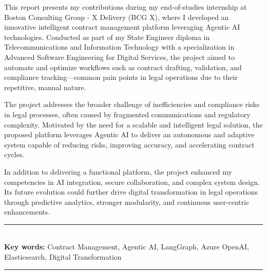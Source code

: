 This report presents my contributions during my end-of-studies internship at Boston Consulting Group - X Delivery (BCG X), where I developed an innovative intelligent contract management platform leveraging Agentic AI technologies. Conducted as part of my State Engineer diploma in Telecommunications and Information Technology with a specialization in Advanced Software Engineering for Digital Services, the project aimed to automate and optimize workflows such as contract drafting, validation, and compliance tracking—common pain points in legal operations due to their repetitive, manual nature.\mynewline

The project addresses the broader challenge of inefficiencies and compliance risks in legal processes, often caused by fragmented communications and regulatory complexity. Motivated by the need for a scalable and intelligent legal solution, the proposed platform leverages Agentic AI to deliver an autonomous and adaptive system capable of reducing risks, improving accuracy, and accelerating contract cycles.\mynewline

In addition to delivering a functional platform, the project enhanced my competencies in AI integration, secure collaboration, and complex system design. Its future evolution could further drive digital transformation in legal operations through predictive analytics, stronger modularity, and continuous user-centric enhancements.

\bigskip

\noindent\rule{\textwidth}{0.3mm} \\[0.4cm]
\textbf{Key words:}
Contract Management, Agentic AI, LangGraph, Azure OpenAI, Elasticsearch, Digital Transformation
\\[0.1cm]
\noindent\rule{\textwidth}{0.3mm} \\[0.4cm]